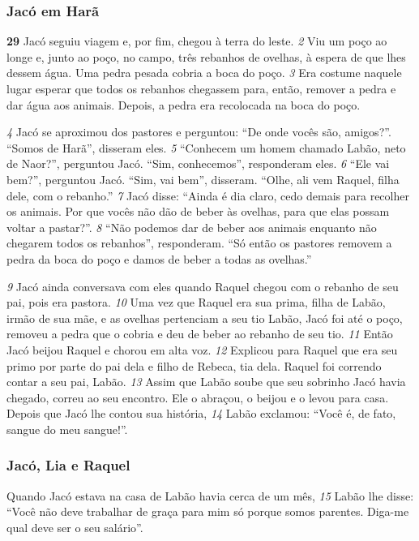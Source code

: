 \bigskip   
\subsubsection*{Jacó em Harã}
\textbf{\large 29}
 Jacó seguiu viagem e, por fim, chegou à terra do leste. 
\textit{\tiny 2} 
Viu um poço ao
longe e, junto ao poço, no campo, três rebanhos de ovelhas, à espera de que lhes
dessem água. Uma pedra pesada cobria a boca do poço.
\textit{\tiny 3} 
Era costume naquele lugar esperar que todos os rebanhos chegassem para,
então, remover a pedra e dar água aos animais. Depois, a pedra era recolocada na
boca do poço. 

\bigskip   
\textit{\tiny 4} 
Jacó se aproximou dos pastores e perguntou: “De onde vocês são,
amigos?”.
   “Somos de Harã”, disseram eles.
\textit{\tiny 5} 
“Conhecem um homem chamado Labão, neto de Naor?”, perguntou Jacó.
   “Sim, conhecemos”, responderam eles.
\textit{\tiny 6} 
“Ele vai bem?”, perguntou Jacó.
   “Sim, vai bem”, disseram. “Olhe, ali vem Raquel, filha dele, com o rebanho.”
\textit{\tiny 7} 
Jacó disse: “Ainda é dia claro, cedo demais para recolher os animais. Por que
vocês não dão de beber às ovelhas, para que elas possam voltar a pastar?”.
\textit{\tiny 8} 
“Não podemos dar de beber aos animais enquanto não chegarem todos os
rebanhos”, responderam. “Só então os pastores removem a pedra da boca do poço
e damos de beber a todas as ovelhas.”

\bigskip   
\textit{\tiny 9} 
Jacó ainda conversava com eles quando Raquel chegou com o rebanho de seu
pai, pois era pastora. 
\textit{\tiny 10}
Uma vez que Raquel era sua prima, filha de Labão, irmão
de sua mãe, e as ovelhas pertenciam a seu tio Labão, Jacó foi até o poço, removeu a
pedra que o cobria e deu de beber ao rebanho de seu tio. 
\textit{\tiny 11}
Então Jacó beijou
Raquel e chorou em alta voz. 
\textit{\tiny 12}
Explicou para Raquel que era seu primo por parte
do pai dela e filho de Rebeca, tia dela. Raquel foi correndo contar a seu pai, Labão.
\textit{\tiny 13}
Assim   que Labão soube que seu sobrinho Jacó havia chegado, correu ao seu
encontro. Ele o abraçou, o beijou e o levou para casa. Depois que Jacó lhe contou
sua história, 
\textit{\tiny 14}
Labão exclamou: “Você é, de fato, sangue do meu sangue!”.

\bigskip   
\subsubsection*{Jacó, Lia e Raquel}
Quando Jacó estava na casa de Labão havia cerca de um mês, 
\textit{\tiny 15}
Labão lhe disse:
“Você não deve trabalhar de graça para mim só porque somos parentes. Diga-me
qual deve ser o seu salário”.

